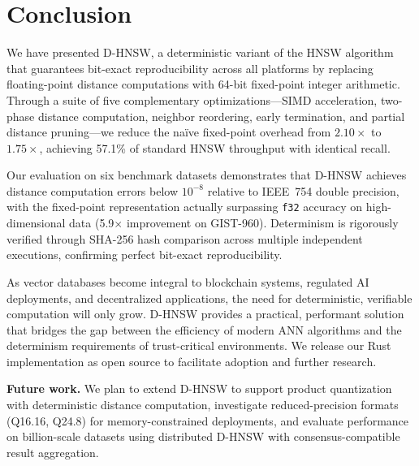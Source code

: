 \documentclass[10pt,journal,compsoc]{IEEEtran}
\newcommand{\dhnsw}{\textsc{D-HNSW}}
\newcommand{\hnsw}{\textsc{HNSW}}
\begin{document}
\section{Conclusion}
\label{sec:conclusion}

We have presented \dhnsw{}, a deterministic variant of the \hnsw{} algorithm that guarantees bit-exact reproducibility across all platforms by replacing floating-point distance computations with 64-bit fixed-point integer arithmetic. Through a suite of five complementary optimizations---SIMD acceleration, two-phase distance computation, neighbor reordering, early termination, and partial distance pruning---we reduce the na\"ive fixed-point overhead from $2.10\times$ to $1.75\times$, achieving 57.1\% of standard \hnsw{} throughput with identical recall.

Our evaluation on six benchmark datasets demonstrates that \dhnsw{} achieves distance computation errors below $10^{-8}$ relative to IEEE~754 double precision, with the fixed-point representation actually surpassing \texttt{f32} accuracy on high-dimensional data (5.9$\times$ improvement on GIST-960). Determinism is rigorously verified through SHA-256 hash comparison across multiple independent executions, confirming perfect bit-exact reproducibility.

As vector databases become integral to blockchain systems, regulated AI deployments, and decentralized applications, the need for deterministic, verifiable computation will only grow. \dhnsw{} provides a practical, performant solution that bridges the gap between the efficiency of modern ANN algorithms and the determinism requirements of trust-critical environments. We release our Rust implementation as open source to facilitate adoption and further research.

\textbf{Future work.} We plan to extend \dhnsw{} to support product quantization with deterministic distance computation, investigate reduced-precision formats (Q16.16, Q24.8) for memory-constrained deployments, and evaluate performance on billion-scale datasets using distributed \dhnsw{} with consensus-compatible result aggregation.

\balance


\end{document}
